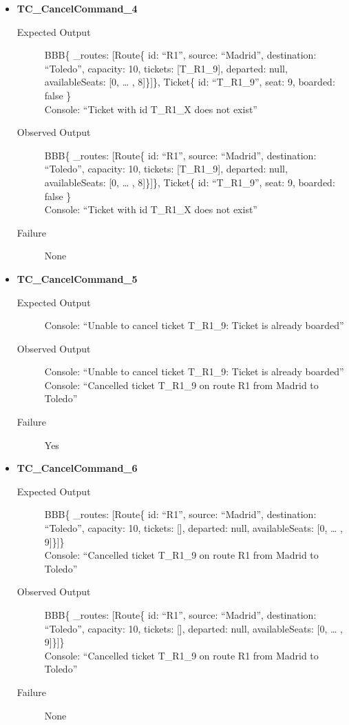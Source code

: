 \documentclass[11pt]{article}
\begin{document}
\begin{itemize}
\item \textbf{TC\_CancelCommand\_4}
\begin{description}
\item[{Expected Output}] BBB\{ \_routes: [Route\{ id: “R1”, source: “Madrid”, destination: “Toledo”, capacity: 10,  tickets: [T\_R1\_9], departed: null, availableSeats: [0, … , 8]\}]\}, Ticket\{ id: “T\_R1\_9”, seat: 9, boarded: false \}\\
Console: “Ticket with id T\_R1\_X does not exist”
\item[{Observed Output}] BBB\{ \_routes: [Route\{ id: “R1”, source: “Madrid”, destination: “Toledo”, capacity: 10,  tickets: [T\_R1\_9], departed: null, availableSeats: [0, … , 8]\}]\}, Ticket\{ id: “T\_R1\_9”, seat: 9, boarded: false \}\\
Console: “Ticket with id T\_R1\_X does not exist”
\item[{Failure}] None
\end{description}

\item \textbf{TC\_CancelCommand\_5}
\begin{description}
\item[{Expected Output}] Console: “Unable to cancel ticket T\_R1\_9: Ticket is already boarded”
\item[{Observed Output}] Console: “Unable to cancel ticket T\_R1\_9: Ticket is already boarded”\\
Console: “Cancelled ticket T\_R1\_9 on route R1 from Madrid to Toledo”
\item[{Failure}] Yes
\end{description}

\item \textbf{TC\_CancelCommand\_6}
\begin{description}
\item[{Expected Output}] BBB\{ \_routes: [Route\{ id: “R1”, source: “Madrid”, destination: “Toledo”, capacity: 10,  tickets: [], departed: null, availableSeats: [0, … , 9]\}]\}\\
Console: “Cancelled ticket T\_R1\_9 on route R1 from Madrid to Toledo”
\item[{Observed Output}] BBB\{ \_routes: [Route\{ id: “R1”, source: “Madrid”, destination: “Toledo”, capacity: 10,  tickets: [], departed: null, availableSeats: [0, … , 9]\}]\}\\
Console: “Cancelled ticket T\_R1\_9 on route R1 from Madrid to Toledo”
\item[{Failure}] None
\end{description}
\end{itemize}
\end{document}
